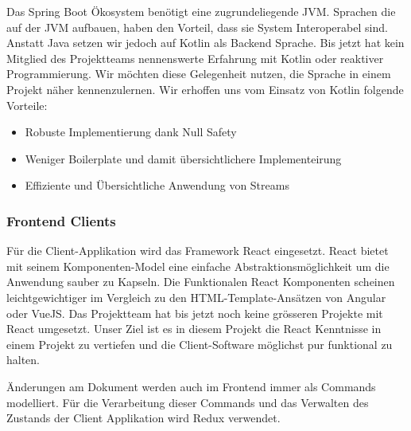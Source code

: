 Das Spring Boot Ökosystem benötigt eine zugrundeliegende JVM\@.
Sprachen die auf der JVM aufbauen, haben den Vorteil, dass sie System Interoperabel sind.
Anstatt Java setzen wir jedoch auf Kotlin als Backend Sprache.
Bis jetzt hat kein Mitglied des Projektteams nennenswerte Erfahrung mit Kotlin oder reaktiver Programmierung.
Wir möchten diese Gelegenheit nutzen, die Sprache in einem Projekt näher kennenzulernen.
Wir erhoffen uns vom Einsatz von Kotlin folgende Vorteile:

\begin{itemize}
    \item Robuste Implementierung dank Null Safety
    \item Weniger Boilerplate und damit übersichtlichere Implementeirung
    \item Effiziente und Übersichtliche Anwendung von Streams
\end{itemize}

\subsubsection{Frontend Clients}

Für die Client-Applikation wird das Framework React eingesetzt.
React bietet mit seinem Komponenten-Model eine einfache Abstraktionsmöglichkeit um die Anwendung sauber zu Kapseln.
Die Funktionalen React Komponenten scheinen leichtgewichtiger im Vergleich zu den HTML-Template-Ansätzen von Angular oder VueJS\@.
Das Projektteam hat bis jetzt noch keine grösseren Projekte mit React umgesetzt.
Unser Ziel ist es in diesem Projekt die React Kenntnisse in einem Projekt zu vertiefen und die Client-Software möglichst pur funktional zu halten.

Änderungen am Dokument werden auch im Frontend immer als Commands modelliert.
Für die Verarbeitung dieser Commands und das Verwalten des Zustands der Client Applikation wird Redux verwendet.

